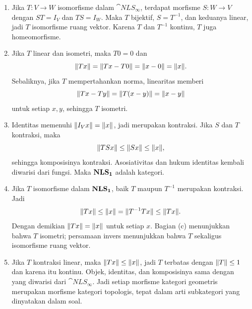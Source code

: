 \begin{o001solution}
\begin{o001proof}
\begin{enumerate}
\item[(b)] Jika $T\colon V\to W$ isomorfisme dalam
$\cat{NLS_{\boldsymbol\infty}}$, terdapat morfisme
$S\colon W\to V$ dengan $ST=I_V$ dan $TS=I_W$. Maka $T$ bijektif,
$S=T^{-1}$, dan keduanya linear, jadi $T$ isomorfisme ruang vektor.
Karena $T$ dan $T^{-1}$ kontinu, $T$ juga homeomorfisme.

\item[(c)] Jika $T$ linear dan isometri, maka $T0=0$ dan
\[
\lVert Tx\rVert=\lVert Tx-T0\rVert=\lVert x-0\rVert=\lVert x\rVert.
\]
Sebaliknya, jika $T$ mempertahankan norma, linearitas memberi
\[
\lVert Tx-Ty\rVert=\lVert T(x-y)\rVert=\lVert x-y\rVert
\]
untuk setiap $x,y$, sehingga $T$ isometri.

\item[(d)] Identitas memenuhi $\lVert I_Vx\rVert=\lVert x\rVert$, jadi merupakan
kontraksi. Jika $S$ dan $T$ kontraksi, maka
\[
\lVert TSx\rVert\le\lVert Sx\rVert\le\lVert x\rVert,
\]
sehingga komposisinya kontraksi. Asosiativitas dan hukum identitas kembali
diwarisi dari fungsi. Maka $\mathbf{NLS_{\mathbf{1}}}$ adalah kategori.

\item[(e)] Jika $T$ isomorfisme dalam $\mathbf{NLS_{\mathbf{1}}}$, baik $T$ maupun
$T^{-1}$ merupakan kontraksi. Jadi
\[
\lVert Tx\rVert\le\lVert x\rVert
=\lVert T^{-1}Tx\rVert\le\lVert Tx\rVert.
\]
Dengan demikian $\lVert Tx\rVert=\lVert x\rVert$ untuk setiap $x$. Bagian (c)
menunjukkan bahwa $T$ isometri; persamaan invers menunjukkan bahwa $T$
sekaligus isomorfisme ruang vektor.

\item[(f)] Jika $T$ kontraksi linear, maka
$\lVert Tx\rVert\le\lVert x\rVert$, jadi $T$ terbatas dengan $\lVert T\rVert\le1$ dan karena
itu kontinu. Objek, identitas, dan komposisinya sama dengan yang diwarisi
dari $\cat{NLS_{\boldsymbol\infty}}$. Jadi setiap morfisme kategori
geometris merupakan morfisme kategori topologis, tepat dalam arti
subkategori yang dinyatakan dalam soal.
\end{enumerate}
\end{o001proof}
\end{o001solution}

